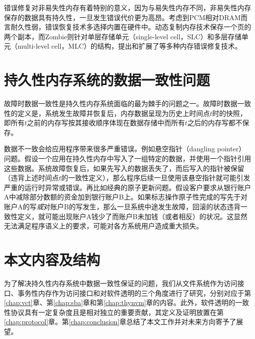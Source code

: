 错误修复对非易失性内存有着特别的意义，因为与易失性内存不同，非易失性内存保存的数据具有持久性，一旦发生错误代价更为高昂。考虑到PCM相对DRAM而言耐久性弱，错误恢复技术多选择内置在硬件中。动态复制内存技术\cite{Ipek:2010:DRM:1736020.1736023}保存一个页的两个副本，而Zombie\cite{Azevedo:2013:ZME:2485922.2485961}则针对单层存储单元（single-level cell，SLC）和多层存储单元（multi-level cell，MLC）的结构，提出和扩展了等多种内存错误修复技术。

\section{持久性内存系统的数据一致性问题}
\label{intro:crash-consistency}

故障时数据一致性是持久性内存系统面临的最为棘手的问题之一\cite{Onur:2014:RPO}。故障时数据一致性的定义是，系统发生故障并恢复后，内存数据呈现为历史上时间点$t$时的快照，即所有$t$之前的内存写按其接收顺序体现在数据存储中而所有$t$之后的内存写都不保存。

数据不一致会给应用程序带来很多严重错误。例如悬空指针（dangling pointer）问题\cite{Volos:2011:MLP:1950365.1950379,Coburn:2011:NMP:1950365.1950380}。假设一个应用在持久性内存中写入了一组特定的数据，并使用一个指针引用这些数据。系统故障恢复后，如果先写入的数据丢失了，而后写入的指针被保留（违背上述时间点$t$的一致性定义），那么程序后续一旦使用该悬空指针就可能引发严重的运行时异常或错误。再比如经典的原子更新问题。假设客户要求从银行账户A中减除部分数额的资金加到银行账户B上。如果标志操作原子性完成的写先于对账户A的写\emph{或}对账户B的写发生，那么一旦系统中途发生故障，回滚的状态违背一致性定义，就可能出现账户A钱少了而账户B未加钱（或者相反）的状况。这显然无法满足程序语义上的要求，可能对各方系统用户造成重大损失。

\section{本文内容及结构}

为了解决持久性内存系统中数据一致性保证的问题，我们从文件系统作为访问接口、事务性内存作为访问接口和对软件透明的三个角度进行了研究，分别对应于第\ref{chap:vct}章、第\ref{chap:sba}章和第\ref{chap:thynvm}章的内容。此外，软件透明的一致性协议具有一定复杂度且是相对独立的重要贡献，其定义及证明放置在第\ref{chap:protocol}章。第\ref{chap:conclusion}章总结了本文工作并对未来方向寄予了展望。


